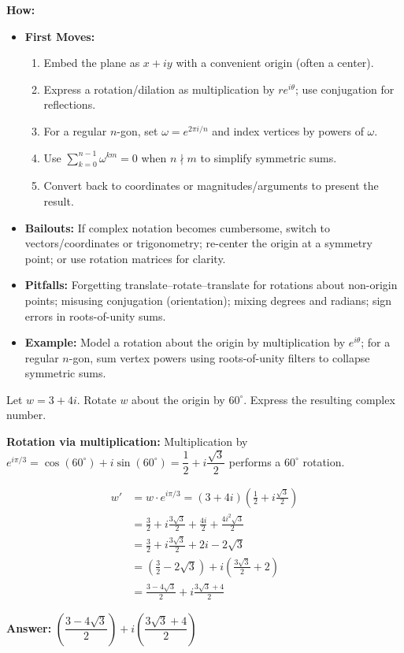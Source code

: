 \documentclass[12pt]{article}
\newenvironment{problem}[1]
{\begin{tcolorbox}[colback=blue!5!white,colframe=blue!75!black,title={#1}]}{\end{tcolorbox}}
\newenvironment{solution}
{\begin{tcolorbox}[colback=green!5!white,colframe=green!75!black,title={Solution}]}{\end{tcolorbox}}
\begin{document}
\textbf{How:}
\begin{itemize}
    \item \textbf{First Moves:}
    \begin{enumerate}[nosep]
        \item Embed the plane as $x+iy$ with a convenient origin (often a center).
        \item Express a rotation/dilation as multiplication by $re^{i\theta}$; use conjugation for reflections.
        \item For a regular $n$-gon, set $\omega=e^{2\pi i/n}$ and index vertices by powers of $\omega$.
        \item Use $\sum_{k=0}^{n-1} \omega^{km}=0$ when $n\nmid m$ to simplify symmetric sums.
        \item Convert back to coordinates or magnitudes/arguments to present the result.
    \end{enumerate}
    \item \textbf{Bailouts:} If complex notation becomes cumbersome, switch to vectors/coordinates or trigonometry; re-center the origin at a symmetry point; or use rotation matrices for clarity.
    \item \textbf{Pitfalls:} Forgetting translate--rotate--translate for rotations about non-origin points; misusing conjugation (orientation); mixing degrees and radians; sign errors in roots-of-unity sums.
    \item \textbf{Example:} Model a rotation about the origin by multiplication by $e^{i\theta}$; for a regular $n$-gon, sum vertex powers using roots-of-unity filters to collapse symmetric sums.
\end{itemize}

\begin{problem}{Example: Complex Rotation}
Let $w = 3 + 4i$. Rotate $w$ about the origin by $60^\circ$. Express the resulting complex number.
\end{problem}

\begin{solution}
\textbf{Rotation via multiplication:} Multiplication by $e^{i\pi/3} = \cos(60^\circ) + i\sin(60^\circ) = \dfrac{1}{2} + i\dfrac{\sqrt{3}}{2}$ performs a $60^\circ$ rotation.

\begin{align}
w' &= w \cdot e^{i\pi/3} = (3 + 4i)\left(\frac{1}{2} + i\frac{\sqrt{3}}{2}\right)\\
&= \frac{3}{2} + i\frac{3\sqrt{3}}{2} + \frac{4i}{2} + \frac{4i^2\sqrt{3}}{2}\\
&= \frac{3}{2} + i\frac{3\sqrt{3}}{2} + 2i - 2\sqrt{3}\\
&= \left(\frac{3}{2} - 2\sqrt{3}\right) + i\left(\frac{3\sqrt{3}}{2} + 2\right)\\
&= \frac{3 - 4\sqrt{3}}{2} + i\frac{3\sqrt{3} + 4}{2}
\end{align}

\textbf{Answer:} $\left(\dfrac{3 - 4\sqrt{3}}{2}\right) + i\left(\dfrac{3\sqrt{3} + 4}{2}\right)$
\end{solution}
\end{document}
